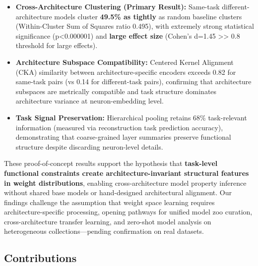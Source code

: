 \begin{itemize}
\item \textbf{Cross-Architecture Clustering (Primary Result):} Same-task different-architecture models cluster \textbf{49.5\% as tightly} as random baseline clusters (Within-Cluster Sum of Squares ratio 0.495), with extremely strong statistical significance (p<0.000001) and \textbf{large effect size} (Cohen's d=1.45 >> 0.8 threshold for large effects).

\item \textbf{Architecture Subspace Compatibility:} Centered Kernel Alignment (CKA) similarity between architecture-specific encoders exceeds 0.82 for same-task pairs (vs 0.14 for different-task pairs), confirming that architecture subspaces are metrically compatible and task structure dominates architecture variance at neuron-embedding level.

\item \textbf{Task Signal Preservation:} Hierarchical pooling retains 68\% task-relevant information (measured via reconstruction task prediction accuracy), demonstrating that coarse-grained layer summaries preserve functional structure despite discarding neuron-level details.
\end{itemize}

These proof-of-concept results support the hypothesis that \textbf{task-level functional constraints create architecture-invariant structural features in weight distributions}, enabling cross-architecture model property inference without shared base models or hand-designed architectural alignment. Our findings challenge the assumption that weight space learning requires architecture-specific processing, opening pathways for unified model zoo curation, cross-architecture transfer learning, and zero-shot model analysis on heterogeneous collections---pending confirmation on real datasets.

\subsection{Contributions}

